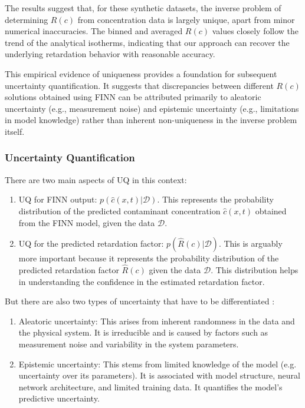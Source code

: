 The results suggest that, for these synthetic datasets, the inverse problem of determining $R(c)$ from concentration data is largely unique, apart from minor numerical inaccuracies. The binned and averaged $R(c)$ values closely follow the trend of the analytical isotherms, indicating that our approach can recover the underlying retardation behavior with reasonable accuracy.

This empirical evidence of uniqueness provides a foundation for subsequent uncertainty quantification. It suggests that discrepancies between different $R(c)$ solutions obtained using FINN can be attributed primarily to aleatoric uncertainty (e.g., measurement noise) and epistemic uncertainty (e.g., limitations in model knowledge) rather than inherent non-uniqueness in the inverse problem itself.




\subsubsection{Uncertainty Quantification}
There are two main aspects of UQ in this context:
\begin{enumerate}
    \item UQ for FINN output: $p(\hat{c}(x,t) | \mathcal{D})$. This represents the probability distribution of the predicted contaminant concentration $\hat{c}(x,t)$ obtained from the FINN model, given the data $\mathcal{D}$.
    \item UQ for the predicted retardation factor: $p(\hat{R}(c) | \mathcal{D})$. This is arguably more important because it represents the probability distribution of the predicted retardation factor $\hat{R}(c)$ given the data $\mathcal{D}$. This distribution helps in understanding the confidence in the estimated retardation factor.
\end{enumerate}

But there are also two types of uncertainty that have to be differentiated \cite{depeweg2018decomposition, gawlikowski2023survey}:

\begin{enumerate}
    \item Aleatoric uncertainty: This arises from inherent randomness in the data and the physical system. It is irreducible and is caused by factors such as measurement noise and variability in the system parameters.
    \item Epistemic uncertainty: This stems from limited knowledge of the model (e.g. uncertainty over its parameters). It is associated with model structure, neural network architecture, and limited training data. It quantifies the model's predictive uncertainty.
\end{enumerate}

